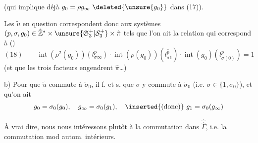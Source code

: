 (qui implique déjà $g_0=\rho g_\infty\ \deleted{\unsure{g_0}}$ dans (17)).

Les $\tilde u$ en question correspondent donc aux systèmes $(p,\sigma,g_0)\in\hat{\mathbb Z}^*\times\unsure{\mathfrak S_3^+|\mathcal S_3^+}\times\hat\pi$ tels que l'on ait la relation qui correspond à ()
\[
(18)\qquad\operatorname{int}(\rho^2(g_0))(l_{\sigma\infty}^p)\cdot\operatorname{int}(\rho(g_0))(l_{\sigma1}^{\overset{*}{p}})\cdot\operatorname{int}(g_0)(l_{\sigma(0)}^p)=1
\]
(et que les trois facteurs engendrent $\hat\pi$\ldots)

b) Pour que $\tilde u$ commute à $\tilde\sigma_0$, il f. et s. que $\sigma$ y commute à $\dot\sigma_0$ (i.e. $\sigma\in\{1,\dot\sigma_0\}$), et qu'on ait
\[
g_0=\sigma_0(g_0),\quad g_\infty=\sigma_0(g_1),\quad\inserted{\text{(donc)}}\ g_1=\sigma_0(g_\infty)
\]



À vrai dire, nous nous intéressons plutôt à la commutation dans $\widehat{\widehat\Gamma}$, i.e. la commutation mod autom. intérieurs.
